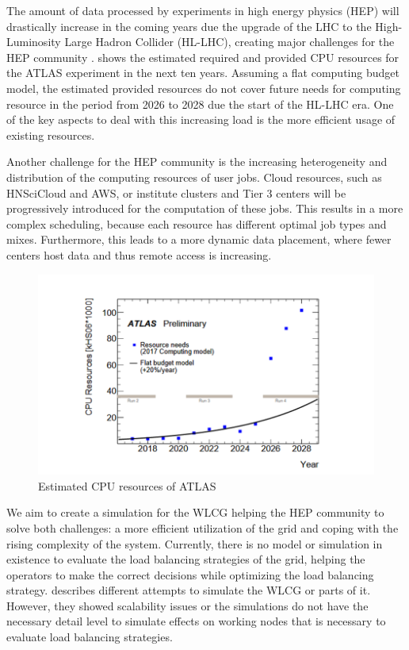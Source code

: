 \documentclass{webofc}
\begin{document}
The amount of data processed by experiments in high energy physics (HEP) will drastically increase in the coming years due the upgrade of the LHC to the High-Luminosity Large Hadron Collider (HL-LHC), creating major challenges for the HEP community \cite{community}.
 shows the estimated required and provided CPU resources for the ATLAS experiment in the next ten years. Assuming a flat computing budget model, the estimated provided resources do not cover future needs for computing resource in the period from 2026 to 2028 due the start of the HL-LHC era. One of the key aspects to deal with this increasing load is the more efficient usage of existing resources.

Another challenge for the HEP community is the increasing heterogeneity and distribution of the computing resources of user jobs. Cloud resources, such as HNSciCloud and AWS, or institute clusters and Tier 3 centers will be progressively introduced for the computation of these jobs. This results in a more complex scheduling, because each resource has different optimal job types and mixes. Furthermore, this leads to a more dynamic data placement, where fewer centers host data and thus remote access is increasing.

\begin{figure}
	\centering
	\includegraphics[width=0.7\linewidth]{images/resources}
	\caption[]{Estimated CPU resources of ATLAS \cite{community}}
	\label{resources}
\end{figure}

We aim to create a simulation for the WLCG helping the HEP community to solve both challenges: a more efficient utilization of the grid and coping with the rising complexity of the system.
Currently, there is no model or simulation in existence to evaluate the load balancing strategies of the grid, helping the operators to make the correct decisions while optimizing the load balancing strategy.
 describes different attempts to simulate the WLCG or parts of it. However, they showed scalability issues or the simulations do not have the necessary detail level to simulate effects on working nodes that is necessary to evaluate load balancing strategies.
\end{document}
